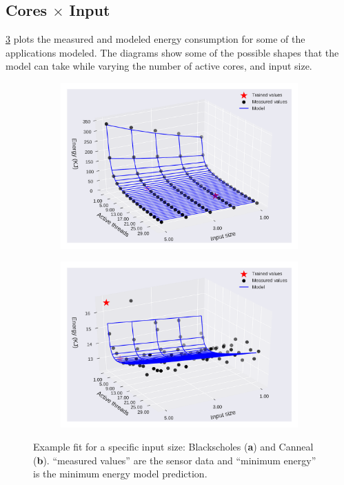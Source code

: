 \subsection{Cores $\times$ Input}
\cref{fig:en_eq_core_inp_ci} plots the measured and modeled energy consumption for some of the applications modeled. The diagrams  show some of the possible shapes that the model can take while varying the number of active cores, and input size.
\begin{figure}[H]
	\centering
	\captionsetup[subfigure]{justification=centering}
	\begin{subfigure}[b]{0.45\textwidth}
		\centerline{\includegraphics[width=\columnwidth]{models/figures/energy/cores_inps/completo_black_5.pdf}}
		\caption{}
		\label{fig:en_eq_black_ci}
	\end{subfigure}
	\begin{subfigure}[b]{0.45\textwidth}
		\centerline{\includegraphics[width=\columnwidth]{models/figures/energy/cores_inps/completo_canneal_1.pdf}}
		\caption{}
		\label{fig:en_eq_canneal_ci}
	\end{subfigure}
	
	\caption{Example fit for a specific input size: Blackscholes (\textbf{a}) and Canneal (\textbf{b}).  “measured values” are the sensor data and “minimum energy” is the minimum energy model prediction.
	}
	\label{fig:en_eq_core_inp_ci}
\end{figure}


